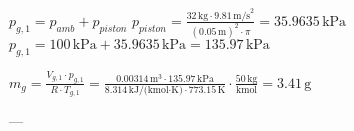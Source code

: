 \( p_{g,1} = p_{amb} + p_{piston} \)  
\( p_{piston} = \frac{32 \, \text{kg} \cdot 9.81 \, \text{m/s}^2}{(0.05 \, \text{m})^2 \cdot \pi} = 35.9635 \, \text{kPa} \)  
\( p_{g,1} = 100 \, \text{kPa} + 35.9635 \, \text{kPa} = 135.97 \, \text{kPa} \)  

\( m_{g} = \frac{V_{g,1} \cdot p_{g,1}}{R \cdot T_{g,1}} = \frac{0.00314 \, \text{m}^3 \cdot 135.97 \, \text{kPa}}{8.314 \, \text{kJ/(kmol·K)} \cdot 773.15 \, \text{K}} \cdot \frac{50 \, \text{kg}}{\text{kmol}} = 3.41 \, \text{g} \)  

---